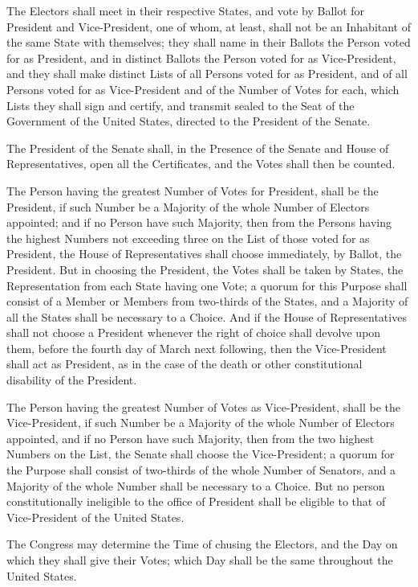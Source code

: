 \documentclass{constitution}
\begin{document}
The Electors shall meet in their respective States, and vote by Ballot for President and Vice-President,
one of whom, at least, shall not be an Inhabitant of the same State with themselves;
they shall name in their Ballots the Person voted for as President,
	and in distinct Ballots the Person voted for as Vice-President,
and they shall make distinct Lists of all Persons voted for as President,
	and of all Persons voted for as Vice-President
and of the Number of Votes for each,
which Lists they shall sign and certify,
and transmit sealed to the Seat of the Government of the United States,
directed to the President of the Senate.

The President of the Senate shall,
in the Presence of the Senate and House of Representatives,
open all the Certificates, and the Votes shall then be counted.

The Person having the greatest Number of Votes for President, shall be the President,
if such Number be a Majority of the whole Number of Electors appointed;
and if no Person have such Majority,
then from the Persons having the highest Numbers
	not exceeding three
on the List of those voted for as President,
the House of Representatives shall choose immediately, by Ballot, the President.
But in choosing the President, the Votes shall be taken by States,
the Representation from each State having one Vote;
a quorum for this Purpose shall consist of a Member or Members from two-thirds of the States,
and a Majority of all the States shall be necessary to a Choice.
And if the House of Representatives shall not choose a President
whenever the right of choice shall devolve upon them,
before the fourth day of March next following,
then the Vice-President shall act as President,
as in the case of the death or other constitutional disability of the President.

The Person having the greatest Number of Votes as Vice-President, shall be the Vice-President,
if such Number be a Majority of the whole Number of Electors appointed,
and if no Person have such Majority,
then from the two highest Numbers on the List,
the Senate shall choose the Vice-President;
a quorum for the Purpose shall consist of two-thirds of the whole Number of Senators,
and a Majority of the whole Number shall be necessary to a Choice.
But no person constitutionally ineligible to the office of President
shall be eligible to that of Vice-President of the United States.

The Congress may determine the Time of chusing the Electors,
and the Day on which they shall give their Votes;
which Day shall be the same throughout the United States.
\end{document}
